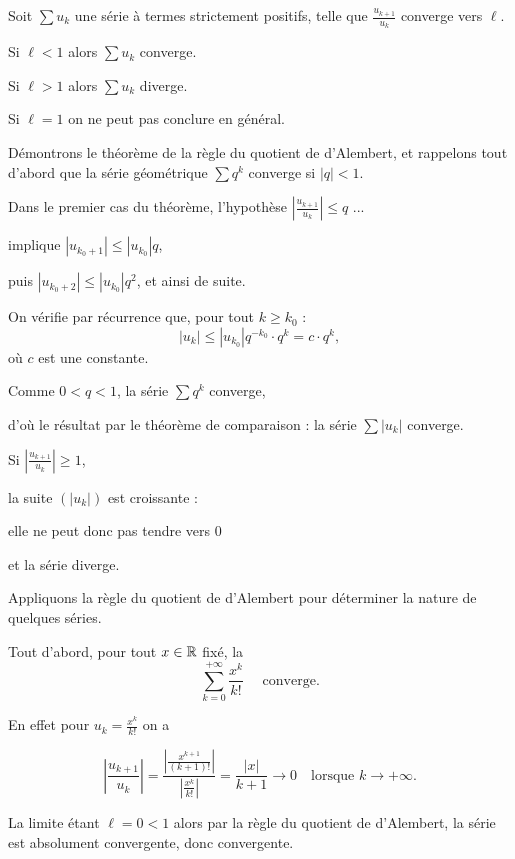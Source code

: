 Soit $\sum u_k$ une série à termes strictement positifs, telle que 
$\frac{u_{k+1}}{u_k}$ converge vers $\ell$.

\change
Si $\ell<1$ alors $\sum u_k$ converge.

\change
Si $\ell>1$ alors $\sum u_k$ diverge.

\change
Si $\ell=1$ on ne peut pas conclure en général.


\diapo

Démontrons le théorème de la règle du quotient de d'Alembert, et rappelons tout d'abord que la série géométrique $\sum q^k$ converge si $|q|<1$.

\change
Dans le premier cas du théorème, l'hypothèse $\left|\frac{u_{k+1}}{u_k}\right| \le q$ ...

\change
implique $|u_{k_0+1}| \le |u_{k_0}| q$, 

\change
puis $|u_{k_0+2}| \le |u_{k_0}| q^2$, et ainsi de suite.

\change
On vérifie par récurrence que, pour tout $k\ge k_0$ :
$$|u_k| \le |u_{k_0}| q^{-k_0} \cdot q^k = c \cdot q^k,$$
où $c$ est une constante.

\change
Comme $0 < q < 1$, la série $\sum q^k$ converge, 

\change
d'où le résultat par le théorème de comparaison : la série $\sum |u_k|$ converge.

\change
Si $\left|\frac{u_{k+1}}{u_k}\right| \ge 1$, 

\change
la suite $(|u_k|)$ est croissante : 

\change
elle ne peut donc pas tendre vers $0$ 

\change
et la série diverge.  

\diapo

Appliquons la règle du quotient de d'Alembert pour déterminer la nature de quelques séries.

\change
Tout d'abord, pour tout $x \in \mathbb{R}$ fixé, la 
$$\sum_{k=0}^{+\infty} \frac{x^k}{k!}\quad \text{ converge.}$$

\change
En effet pour $u_k = \frac{x^k}{k!}$ on a 

\change
$$\left|\frac{u_{k+1}}{u_k}\right|
= \frac{\left|\frac{x^{k+1}}{(k+1)!}\right|}{\left|\frac{x^k}{k!}\right|}
=\frac{|x|}{k+1} \to 0 
\quad \text{lorsque } k \to +\infty.$$

\change
La limite étant $\ell = 0 < 1$ alors par la règle du quotient de d'Alembert,
la série est absolument convergente, donc convergente.


